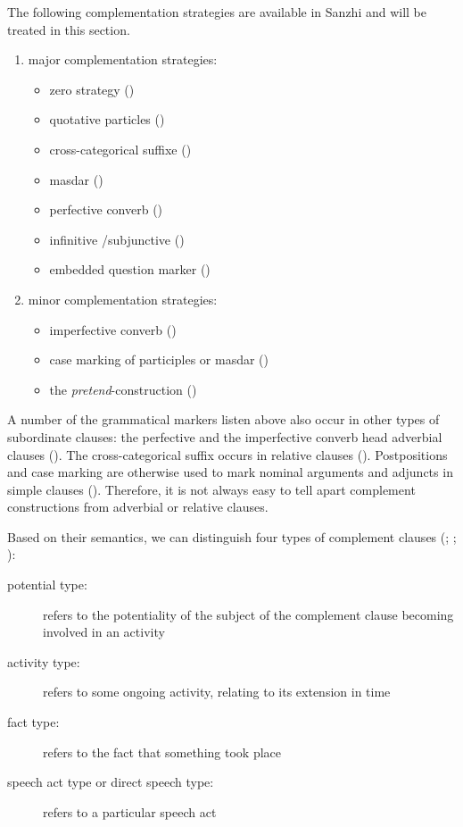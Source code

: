 The following complementation strategies are available in Sanzhi and will be treated in this section.
%
\begin{enumerate}
	\item	major complementation strategies:
	\begin{itemize}
		\item	zero strategy ()
		\item	quotative particles  ()
		\item	cross-categorical suffixe  ()
		\item	masdar  ()
		\item	perfective converb  ()
		\item	infinitive \slash subjunctive ()
		\item	embedded question marker  ()
	\end{itemize}

	\item	minor complementation strategies:
	\begin{itemize}
		\item	imperfective converb  ()
		\item	case marking of participles or masdar ()
		\item the \textit{pretend}-construction ()
	\end{itemize}
\end{enumerate}

A number of the grammatical markers listen above also occur in other types of subordinate clauses: the perfective and the imperfective converb head adverbial clauses (). The cross-categorical suffix  occurs in relative clauses (). Postpositions and case marking are otherwise used to mark nominal arguments and adjuncts in simple clauses (). Therefore, it is not always easy to tell apart complement constructions from adverbial or relative clauses.

Based on their semantics, we can distinguish four types of complement clauses (\citealp[130]{Hengeveld1989}; \citealp[93]{Dik1997}; \citealp{Dixon2006}):
%
\begin{description}
	\item[potential type:]  refers to the potentiality of the subject of the complement clause becoming involved in an activity
	\item[activity type:] refers to some ongoing activity, relating to its extension in time
	\item[fact type:] refers to the fact that something took place
	\item[speech act type or direct speech type:] refers to a particular speech act
\end{description}

